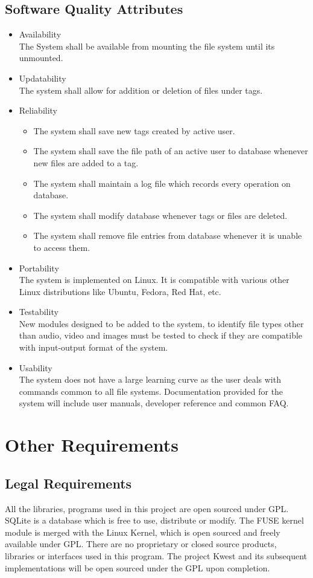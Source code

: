 \subsection {Software Quality Attributes}
\begin{itemize}
\item Availability \\
The System shall be available from mounting the file system until its unmounted.
\item Updatability \\
The system shall allow for addition or deletion of files under tags.
\item Reliability
\begin{itemize}
\item The system shall save new tags created by active user.
\item The system shall save the file path of an active user to database whenever new files are added to a tag.
\item The system shall maintain a log file which records every operation on database.
\item The system shall modify database whenever tags or files are deleted.
\item The system shall remove file entries from database whenever it is unable to access them.
\end{itemize}
\item Portability \\
The system is implemented on Linux. It is compatible with various other Linux distributions like Ubuntu, Fedora, Red Hat, etc.
\item Testability \\
New modules designed to be added to the system, to identify file types other than audio, video and images must be tested to check if they are compatible with input-output format of the system.
\item Usability \\
The system does not have a large learning curve as the user deals with commands common to all file systems. Documentation provided for the system will include user manuals, developer reference and common FAQ.
\end{itemize}

\section{Other Requirements}
\subsection{Legal Requirements}

All the libraries, programs used in this project are open sourced under GPL. SQLite is a
database which is free to use, distribute or modify. The FUSE kernel module is merged
with the Linux Kernel, which is open sourced and freely available under GPL. There
are no proprietary or closed source products, libraries or interfaces used in this program.
The project Kwest and its subsequent implementations will be open sourced under the
GPL upon completion.

